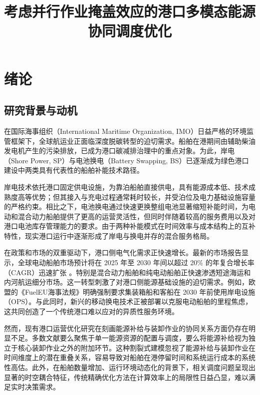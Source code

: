 \documentclass[UTF8, a4paper, 12pt]{ctexart}
\begin{document}
\title{\heiti{} 考虑并行作业掩盖效应的港口多模态能源协同调度优化}
\author{}
\date{}
\maketitle

\section{绪论}
\label{sec:intro}

\subsection{研究背景与动机}
在国际海事组织（International Maritime Organization, IMO）日益严格的环境监管框架下，全球航运业正面临深度脱碳转型的迫切需求。船舶在港期间由辅助柴油发电机产生的污染排放，已成为港口碳减排治理中的重点对象。为此，岸电（Shore Power, SP）与电池换电（Battery Swapping, BS）已逐渐成为绿色港口建设中两类具有代表性的船舶补能技术路径。

岸电技术依托港口固定供电设施，为靠泊船舶直接供电，具有能源成本低、技术成熟度高等优势；但其接入与充电过程通常耗时较长，并受泊位及电力基础设施容量的严格约束。相比之下，电池换电通过快速更换整组电池显著缩短补能时间，为电动和混合动力船舶提供了更高的运营灵活性，但同时伴随着较高的服务费用以及对港口电池库存管理能力的要求。由于两种补能模式在时间效率与成本结构上的互补特性，现实港口运行中逐渐形成了岸电与换电并存的混合服务格局。

在政策和市场的双重驱动下，港口侧电气化需求正快速增长。最新的市场报告显示，全球电动船舶市场预计将在 2025 年至 2030 年间以超过 20\% 的年复合增长率（CAGR）迅速扩张 \cite{Markets2025}。特别是混合动力船舶和纯电动船舶正快速渗透短途海运和内河航运细分市场。这一转型刺激了对港口侧能源基础设施的迫切需求。例如，欧盟的《FuelEU海事法规》明确强制要求集装箱船和客船在 2030 年前使用岸电设施（OPS）\cite{EU2025}。与此同时，新兴的移动换电技术正被部署以克服电动船舶的里程焦虑，这共同创造了一个传统港口难以应对的异质性服务环境。

然而，现有港口运营优化研究在刻画能源补给与装卸作业的协同关系方面仍存在明显不足。多数文献要么聚焦于单一能源资源的配置与调度，要么将能源补给视为独立于核心装卸作业之外的附加环节。这种割裂式建模忽视了能源补给与装卸作业在时间维度上的潜在重叠关系，容易导致对船舶在港停留时间和系统运行成本的系统性高估。此外，在船舶数量增加、运行环境动态化的背景下，相关调度问题呈现出显著的时空耦合特征，传统精确优化方法在计算效率上的局限性日益凸显，难以满足实时决策需求。
\end{document}
